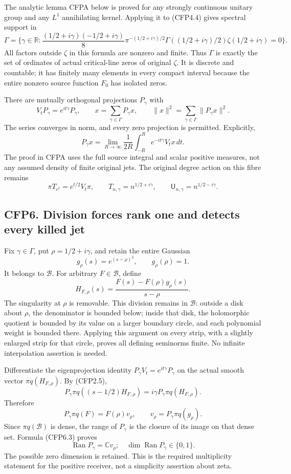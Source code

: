 The analytic lemma CFPA below is proved for any strongly continuous
unitary group and any \(L^1\) annihilating kernel. Applying it to
(CFP4.4) gives spectral support in \[
\Gamma=\{\gamma\in\mathbb R:
\frac{(1/2+i\gamma)(-1/2+i\gamma)}8
\pi^{-(1/2+i\gamma)/2}
\Gamma((1/2+i\gamma)/2)\zeta(1/2+i\gamma)=0\}.
\tag{CFP5.1}
\] All factors outside \(\zeta\) in this formula are nonzero and finite.
Thus \(\Gamma\) is exactly the set of ordinates of actual critical-line
zeros of original \(\zeta\). It is discrete and countable; it has
finitely many elements in every compact interval because the entire
nonzero source function \(F_0\) has isolated zeros.

There are mutually orthogonal projections \(P_\gamma\) with \[
V_tP_\gamma=e^{it\gamma}P_\gamma,
\qquad x=\sum_{\gamma\in\Gamma}P_\gamma x,
\qquad \|x\|^2=\sum_{\gamma\in\Gamma}\|P_\gamma x\|^2.
\tag{CFP5.2}
\] The series converges in norm, and every zero projection is permitted.
Explicitly, \[
P_\gamma x=\lim_{R\to\infty}\frac1{2R}
\int_{-R}^{R}e^{-it\gamma}V_tx\,dt.
\tag{CFP5.3}
\] The proof in CFPA uses the full source integral and scalar positive
measures, not any assumed density of finite original jets. The original
degree action on this fibre remains \[
\pi T_{e^t}=e^{t/2}V_t\pi,
\qquad T_{n,\gamma}=n^{1/2+i\gamma},
\qquad \mathsf U_{n,\gamma}=n^{1/2-i\gamma}.
\tag{CFP5.4}
\]

\subsection{CFP6. Division forces rank one and detects every killed
jet}\label{cfp6.-division-forces-rank-one-and-detects-every-killed-jet}

Fix \(\gamma\in\Gamma\), put \(\rho=1/2+i\gamma\), and retain the entire
Gaussian \[
g_\rho(s)=e^{(s-\rho)^2},\qquad g_\rho(\rho)=1.
\tag{CFP6.1}
\] It belongs to \(\mathcal B\). For arbitrary \(F\in\mathcal B\),
define \[
H_{F,\rho}(s)=\frac{F(s)-F(\rho)g_\rho(s)}{s-\rho}.
\tag{CFP6.2}
\] The singularity at \(\rho\) is removable. This division remains in
\(\mathcal B\): outside a disk about \(\rho\), the denominator is
bounded below; inside that disk, the holomorphic quotient is bounded by
its value on a larger boundary circle, and each polynomial weight is
bounded there. Applying this argument on every strip, with a slightly
enlarged strip for that circle, proves all defining seminorms finite. No
infinite interpolation assertion is needed.

Differentiate the eigenprojection identity
\(P_\gamma V_t=e^{it\gamma}P_\gamma\) on the actual smooth vector
\(\pi q(H_{F,\rho})\). By (CFP2.5), \[
P_\gamma\pi q((s-1/2)H_{F,\rho})
=i\gamma P_\gamma\pi q(H_{F,\rho}).
\] Therefore \[
\boxed{P_\gamma\pi q(F)
=F(\rho)v_\rho,\qquad
v_\rho=P_\gamma\pi q(g_\rho).}
\tag{CFP6.3}
\] Since \(\pi q(\mathcal B)\) is dense, the range of \(P_\gamma\) is
the closure of its image on that dense set. Formula (CFP6.3) proves \[
\operatorname{Ran}P_\gamma=\mathbb C v_\rho;
\quad\dim\operatorname{Ran}P_\gamma\in\{0,1\}.
\tag{CFP6.4}
\] The possible zero dimension is retained. This is the required
multiplicity statement for the positive receiver, not a simplicity
assertion about zeta.

